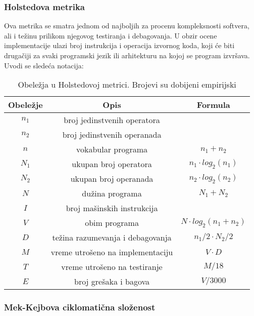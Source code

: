 \documentclass[a4paper]{article}
\begin{document}
\subsubsection{Holstedova metrika}
\label{subsec:holsted}

Ova metrika se smatra jednom od najboljih za procenu kompleksnosti softvera, ali i težinu prilikom njegovog testiranja i debagovanja. U obzir ocene implementacije ulazi broj instrukcija i operacija izvornog koda, koji će biti drugačiji za svaki programski jezik ili arhitekturu na kojoj se program izvršava. Uvodi se sledeća notacija:\\

\begin{table}[h]
\centering
 \begin{tabular}{|c|c|c|}
  \hline
  Obeležje & Opis & Formula \\ [0ex] 
  \hline
  $n_1$ & broj jedinstvenih operatora & \\ 
  \hline
  $n_2$ & broj jedinstvenih operanada & \\ 
  \hline
  $n$ & vokabular programa & $ n_1 + n_2 $ \\ 
  \hline
  $N_1$ & ukupan broj operatora & $ n_1 \cdot log_2(n_1) $ \\ 
  \hline
  $N_2$ & ukupan broj operanada & $ n_2 \cdot log_2(n_2) $ \\ 
  \hline
  $N$ & dužina programa & $ N_1 + N_2 $ \\
  \hline
  $I$ & broj mašinskih instrukcija & \\
  \hline
  $V$ & obim programa & $ N \cdot log_2(n_1+n_2) $ \\
  \hline
  $D$ & težina razumevanja i debagovanja & $ n_1/2 \cdot N_2 / 2  $ \\
  \hline
  $M$ & vreme utrošeno na implementaciju & $ V \cdot D $ \\
  \hline
  $T$ & vreme utrošeno na testiranje & $ M / 18 $ \\
  \hline
  $E$ & broj grešaka i bagova & $ V / 3000 $ \\
  \hline
 \end{tabular}
 \caption{Obeležja u Holstedovoj metrici. Brojevi su dobijeni empirijski \cite{ibm_halstead}}
 \label{tabela:1} 
\end{table}

\subsubsection{Mek-Kejbova ciklomatična složenost}
\label{subsec:mekkejb}
\end{document}
